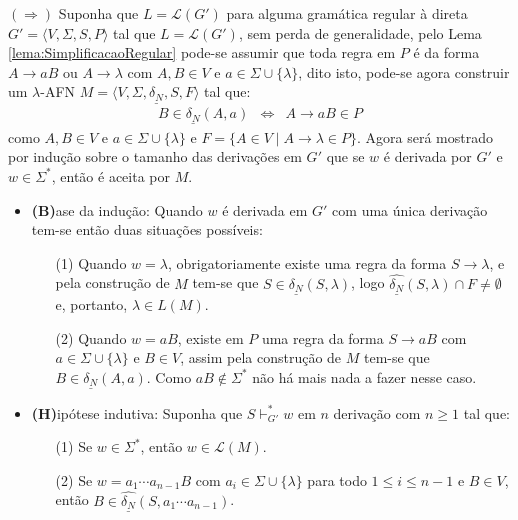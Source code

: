 \begin{prova}
	$(\Rightarrow)$ Suponha que $L = \mathcal{L}(G')$ para alguma gramática regular à direta $G' = \langle V, \Sigma, S, P \rangle$ tal que $L = \mathcal{L}(G')$, sem perda de generalidade, pelo Lema \ref{lema:SimplificacaoRegular} pode-se assumir que toda regra em $P$ é da forma $A \rightarrow aB$ ou $A \rightarrow \lambda$ com $A, B \in V$ e $a \in \Sigma \cup \{\lambda\}$, dito isto, pode-se agora construir um $\lambda$-AFN $M = \langle V, \Sigma, \underline{\delta_N}, S, F \rangle$ tal que:
	\begin{eqnarray*}
		B \in \underline{\delta_N}(A, a) & \Longleftrightarrow & A \rightarrow aB \in P
	\end{eqnarray*}
	como $A, B \in V$ e $a \in \Sigma \cup \{\lambda\}$ e $F = \{A \in V \mid A \rightarrow \lambda \in P\}$. Agora será mostrado por indução sobre o tamanho das derivações em $G'$ que se $w$ é derivada por $G'$ e $w \in \Sigma^*$, então é aceita por $M$.
	\begin{itemize}
		\item \textbf{(B)}ase da indução: Quando $w$ é derivada em $G'$ com uma única derivação tem-se então duas situações possíveis:
		\begin{itemize}
			\item[(1)] Quando $w = \lambda$, obrigatoriamente existe uma regra da forma $S \rightarrow \lambda$, e pela construção de $M$ tem-se que $S \in \underline{\delta_N}(S, \lambda)$, logo $\widehat{\underline{\delta_N}}(S, \lambda) \cap F \neq \emptyset$ e, portanto, $\lambda \in L(M)$. 
			\item[(2)] Quando $w = aB$, existe em $P$ uma regra da forma $S \rightarrow aB$ com $a \in \Sigma \cup \{\lambda\}$ e $B \in V$, assim pela construção de $M$ tem-se que $B \in \underline{\delta_N}(A, a)$. Como $aB \notin \Sigma^*$ não há mais nada a fazer nesse caso.
		\end{itemize}
		
		\item \textbf{(H)}ipótese indutiva: Suponha que $S \vdash^*_{G'} w$ em $n$ derivação com $n \geq 1$ tal que:
		\begin{itemize}
			\item[(1)] Se $w \in \Sigma^*$, então $w \in \mathcal{L}(M)$.
			\item[(2)] Se $w = a_1\cdots a_{n-1}B$ com $a_i \in \Sigma \cup \{\lambda\}$ para todo $1 \leq i \leq n-1$ e $B \in V$, então $B \in \widehat{\underline{\delta_N}}(S, a_1\cdots a_{n-1})$.
		\end{itemize}
		

\end{itemize}
\end{prova}
